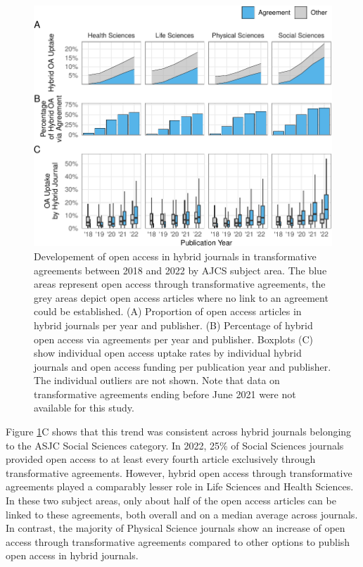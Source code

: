 \documentclass[a4paper,man,floatsintext,longtable,noextraspace,12pt]{apa6}
\begin{document}
\begin{figure}[ht!]

{\centering \includegraphics[width=0.99\linewidth,]{fig/subject_panel-1} 

}

\caption{Developement of open access in hybrid journals in transformative agreements between 2018 and 2022 by AJCS subject area. The blue areas represent open access through transformative agreements, the grey areas depict open access articles where no link to an agreement could be established. (A) Proportion of open access articles in hybrid journals per year and publisher. (B) Percentage of hybrid open access via agreements per year and publisher. Boxplots (C) show individual open access uptake rates by individual hybrid journals and open access funding per publication year and publisher. The individual outliers are not shown. Note that data on transformative agreements ending before June 2021 were not available for this study.}\label{fig:subject_panel}
\end{figure}

Figure \ref{fig:subject_panel}C shows that this trend was consistent
across hybrid journals belonging to the ASJC Social Sciences category.
In 2022, 25\% of Social Sciences journals provided open access to at
least every fourth article exclusively through transformative
agreements. However, hybrid open access through transformative
agreements played a comparably lesser role in Life Sciences and Health
Sciences. In these two subject areas, only about half of the open access
articles can be linked to these agreements, both overall and on a median
average across journals. In contrast, the majority of Physical Science
journals show an increase of open access through transformative
agreements compared to other options to publish open access in hybrid
journals.
\end{document}
